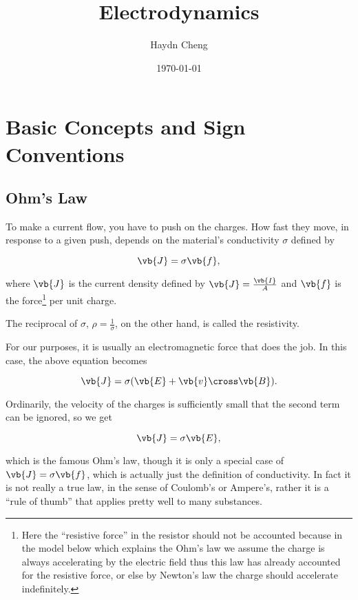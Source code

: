 \documentclass[english,a4paper,12pt]{report}
\title{Electrodynamics}
\author{Haydn Cheng}
\date{\today}
\begin{document}
\maketitle
\tableofcontents
    
\chapter{Basic Concepts and Sign Conventions}

\section{Ohm's Law}

To make a current flow, you have to push on the charges. How fast they move, in response to a given push, depends on the material's conductivity \(\sigma \) defined by 

\begin{equation}
    \vb{J} = \sigma \vb{f} , \label{ohm} 
\end{equation}

where \(\vb{J} \) is the current density defined by \(\vb{J} = \frac{\vb{I} }{A} \) and \(\vb{f} \) is the force\footnote{Here the ``resistive force'' in the resistor should not be accounted because in the model below which explains the Ohm's law we assume the charge is always accelerating by the electric field thus this law has already accounted for the resistive force, or else by Newton's law the charge should accelerate indefinitely.}   per unit charge. 

The reciprocal of \(\sigma \), \(\rho =\frac{1}{\sigma } \), on the other hand, is called the resistivity.  

For our purposes, it is usually an electromagnetic force that does the job. In this case, the above equation becomes

\begin{equation}
    \vb{J} = \sigma (\vb{E} + \vb{v} \cross \vb{B} ).
\end{equation}

Ordinarily, the velocity of the charges is sufficiently small that the second term can be ignored, so we get

\begin{equation}
    \vb{J} = \sigma \vb{E} ,
\end{equation}

which is the famous Ohm's law, though it is only a special case of \(\vb{J} = \sigma \vb{f} \), which is actually just the definition of conductivity. In fact it is not really a true law, in the sense of Coulomb's or Ampere's, rather it is a ``rule of thumb'' that applies pretty well to many substances.
\end{document}
